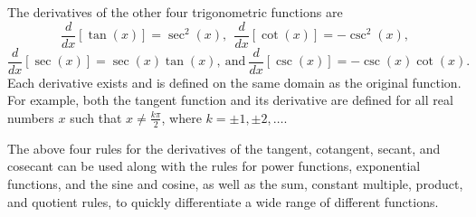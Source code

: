 

\begin{summary}
\item The derivatives of the other four trigonometric functions are
$$\frac{d}{dx}[\tan(x)] = \sec^2(x), \ \ \frac{d}{dx}[\cot(x)] = -\csc^2(x),$$ 
$$\frac{d}{dx}[\sec(x)] = \sec(x)\tan(x), \ \mbox{and} \ \frac{d}{dx}[\csc(x)] = -\csc(x)\cot(x).$$
Each derivative exists and is defined on the same domain as the original function.  For example, both the tangent function and its derivative are defined for all real numbers $x$ such that $x \ne \frac{k\pi}{2}$, where $k = \pm 1, \pm 2, \ldots$.
\item The above four rules for the derivatives of the tangent, cotangent, secant, and cosecant can be used along with the rules for power functions, exponential functions, and the sine and cosine, as well as the sum, constant multiple, product, and quotient rules, to quickly differentiate a wide range of different functions.
\end{summary}

\nin \hrulefill

 

\clearpage